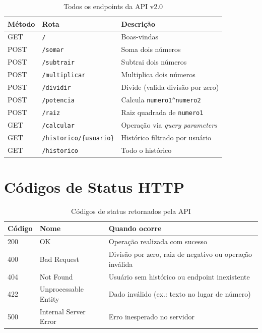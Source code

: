 \documentclass[12pt, a4paper]{article}
\begin{document}
\begin{table}[H]
  \centering
  \caption{Todos os endpoints da API v2.0}
  \begin{tabularx}{\linewidth}{llX}
    \toprule
    \textbf{Método} & \textbf{Rota} & \textbf{Descrição} \\
    \midrule
    GET  & \texttt{/}                    & Boas-vindas \\
    POST & \texttt{/somar}               & Soma dois números \\
    POST & \texttt{/subtrair}            & Subtrai dois números \\
    POST & \texttt{/multiplicar}         & Multiplica dois números \\
    POST & \texttt{/dividir}             & Divide (valida divisão por zero) \\
    POST & \texttt{/potencia}            & Calcula \texttt{numero1\^{}numero2} \\
    POST & \texttt{/raiz}                & Raiz quadrada de \texttt{numero1} \\
    GET  & \texttt{/calcular}            & Operação via \textit{query parameters} \\
    GET  & \texttt{/historico/\{usuario\}} & Histórico filtrado por usuário \\
    GET  & \texttt{/historico}           & Todo o histórico \\
    \bottomrule
  \end{tabularx}
\end{table}

\section{Códigos de Status HTTP}

\begin{table}[H]
  \centering
  \caption{Códigos de status retornados pela API}
  \begin{tabularx}{\linewidth}{llX}
    \toprule
    \textbf{Código} & \textbf{Nome} & \textbf{Quando ocorre} \\
    \midrule
    200 & OK                    & Operação realizada com sucesso \\
    400 & Bad Request           & Divisão por zero, raiz de negativo ou operação inválida \\
    404 & Not Found             & Usuário sem histórico ou endpoint inexistente \\
    422 & Unprocessable Entity  & Dado inválido (ex.: texto no lugar de número) \\
    500 & Internal Server Error & Erro inesperado no servidor \\
    \bottomrule
  \end{tabularx}
\end{table}
\end{document}
